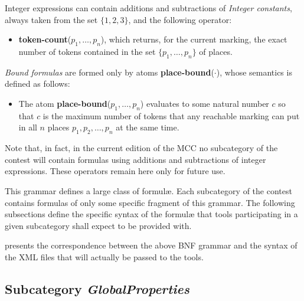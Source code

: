 \documentclass[10pt,english,a4paper]{article}
\newcommand\eqdef            {\mathrel{:=}}
\newcommand\set[1]           {{\{ #1 \mathclose \}}}
\newcommand\N                {\mathbb{N}}
\newcommand\atomplacebnd[1]  {\textbf{place-bound}(#1)}
\newcommand\atomtokenscnt[1] {\textbf{token-count}(#1)}
\newcommand{\mcc}[0]{MCC}
\newcommand\mysubsection[1]{\color{sectioncolor}\subsection{#1}\color{defaultcolor}}
\begin{document}
Integer expressions can contain additions and subtractions of
\emph{Integer constants}, always taken from the set $\set{1, 2, 3}$, and
the following operator:
\begin{itemize}
\item
  \atomtokenscnt{$p_1, \ldots, p_n$}, which returns, for the current
  marking, the exact number of tokens contained in the set
  $\set{p_1, \ldots, p_n}$ of places.
\end{itemize}

\textit{Bound formulas} are formed only by atoms \atomplacebnd{$\cdot$}, whose semantics
is defined as follows:
\begin{itemize}
\item
  The atom \atomplacebnd{$p_1, \ldots, p_n$} evaluates to some
  natural number $c$ so that $c$ is the maximum number of tokens that any reachable marking can put in all $n$
  places $p_1, p_2, \ldots, p_n$ at the same time.
\end{itemize}

Note that, in fact, in the current edition of the \mcc{} no subcategory of the
contest will contain formulas using additions and subtractions of integer
expressions. These operators remain here only for future use.


This grammar defines a large class of formulæ.
Each subcategory of the contest contains formulas of only some specific
fragment of this grammar.
The following subsections define the specific syntax of the formul\ae{}
that tools participating in a given subcategory shall expect to be provided
with.

 presents the correspondence between the above BNF grammar
and the syntax of the XML files that will actually be passed to the tools.

\mysubsection{Subcategory \textit{GlobalProperties}}
\end{document}

